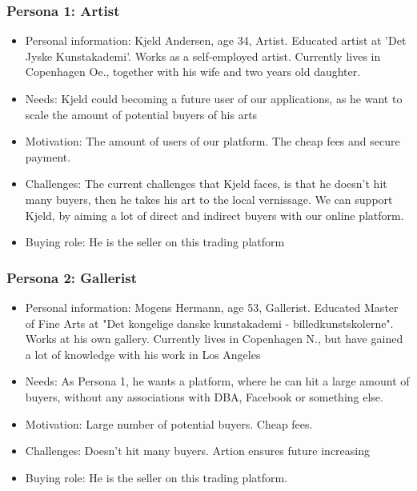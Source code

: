 \subsubsection*{Persona 1: Artist}

\begin{itemize}
    \item Personal information: Kjeld Andersen, age 34, Artist. Educated artist at 'Det Jyske Kunstakademi'. Works as a self-employed artist. Currently lives in Copenhagen Oe., together with his wife and two years old daughter.
    \item Needs: Kjeld could becoming a future user of our applications, as he want to scale the amount of potential buyers of his arts
    \item Motivation: The amount of users of our platform. The cheap fees and secure payment.
    \item Challenges: The current challenges that Kjeld faces, is that he doesn't hit many buyers, then he takes his art to the local vernissage. We can support Kjeld, by aiming a lot of direct and indirect buyers with our online platform.
    \item Buying role: He is the seller on this trading platform
\end{itemize}

\subsubsection{Persona 2: Gallerist}
\begin{itemize}
    \item Personal information: Mogens Hermann, age 53, Gallerist. Educated Master of Fine Arts at "Det kongelige danske kunstakademi - billedkunstskolerne". Works at his own gallery. Currently lives in Copenhagen N., but have gained a lot of knowledge with his work in Los Angeles
    \item Needs: As Persona 1, he wants a platform, where he can hit a large amount of buyers, without any associations with DBA, Facebook or something else. 
    \item Motivation: Large number of potential buyers. Cheap fees. 
    \item Challenges: Doesn't hit many buyers. Artion ensures future increasing
    \item Buying role: He is the seller on this trading platform.
\end{itemize}

